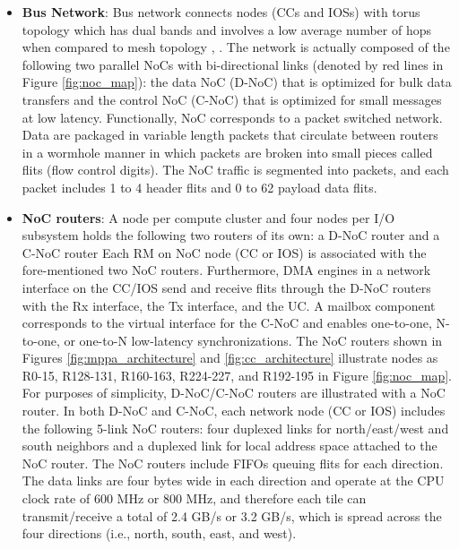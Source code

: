 \documentclass{sig-alternate-05-2015}
\begin{document}
\begin{itemize}
\item \textbf{Bus Network}:
Bus network connects nodes (CCs and IOSs) with torus topology \cite{dally2001route}
which has dual bands and involves a low average number of hops when compared to mesh topology \cite{vangal200780}, \cite{taylor2002raw}.
The network is actually composed of the following two parallel NoCs with bi-directional links (denoted by red lines in Figure \ref{fig:noc_map}):
the data NoC (D-NoC) that is optimized for bulk data transfers and the control NoC (C-NoC) that is optimized for small messages at low latency.
Functionally, NoC corresponds to a packet switched network.
Data are packaged in variable length packets that circulate between routers in a wormhole manner in which packets are broken into small pieces called flits (flow control digits).
The NoC traffic is segmented into packets, and each packet includes 1 to 4 header flits and 0 to 62 payload data flits.

\item \textbf{NoC routers}:
A node per compute cluster and four nodes per I/O subsystem holds the following two routers of its
own: a D-NoC router and a C-NoC router
Each RM on NoC node (CC or IOS) is associated with the fore-mentioned two NoC routers.
Furthermore, DMA engines in a network interface on the CC/IOS send and receive flits through the D-NoC routers with the Rx interface, the Tx interface, and the UC.
A mailbox component corresponds to the virtual interface for the C-NoC and enables one-to-one, N-to-one, or one-to-N low-latency synchronizations.
The NoC routers shown in Figures \ref{fig:mppa_architecture} and \ref{fig:cc_architecture} illustrate nodes as R0-15, R128-131, R160-163, R224-227, and R192-195 in Figure \ref{fig:noc_map}.
For purposes of simplicity, D-NoC/C-NoC routers are illustrated with a NoC router.
In both D-NoC and C-NoC, each network node (CC or IOS)  includes the following 5-link NoC routers:
four duplexed links for north/east/west and south neighbors and a duplexed link for local address space attached to the NoC router.
The NoC routers include FIFOs queuing flits for each direction.
The data links are four bytes wide in each direction and operate at the CPU clock rate of 600 MHz or 800 MHz, and therefore each tile can transmit/receive a total of 2.4 GB/s or 3.2 GB/s, which is spread across the four directions (i.e., north, south, east, and west).
\end{itemize}
\end{document}
